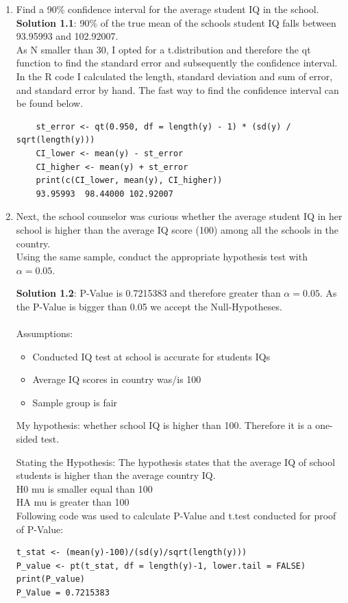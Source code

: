 \documentclass[12pt,letterpaper]{article}
\begin{document}
\begin{enumerate}
	\item Find a 90\% confidence interval for the average student IQ in the school.\\
	
\textbf{Solution 1.1}: 90\% of the true mean of the schools student IQ falls between 93.95993 and 102.92007.\\
As N smaller than 30, I opted for a t.distribution and therefore the qt function to find the standard error and subsequently the confidence interval. In the R code I calculated the length, standard deviation and sum of error, and standard error by hand. The fast way to find the confidence interval can be found below. 

\begin{verbatim}
	st_error <- qt(0.950, df = length(y) - 1) * (sd(y) / sqrt(length(y)))
	CI_lower <- mean(y) - st_error
	CI_higher <- mean(y) + st_error
	print(c(CI_lower, mean(y), CI_higher))
	93.95993  98.44000 102.92007
\end{verbatim}

	
	\item Next, the school counselor was curious  whether  the average student IQ in her school is higher than the average IQ score (100) among all the schools in the country.\\ 
	
	\noindent Using the same sample, conduct the appropriate hypothesis test with $\alpha=0.05$.
	
	\textbf{Solution 1.2}: P-Value is 0.7215383 and therefore greater than $\alpha=0.05$. As the P-Value is bigger than 0.05 we accept the Null-Hypotheses.\\
	\\
	Assumptions:
	\begin{itemize}
		\item Conducted IQ test at school is accurate for students IQs
		\item Average IQ scores in country was/is 100
		\item Sample group is fair
	\end{itemize}
	
My hypothesis: whether school IQ is higher than 100. 
Therefore it is a one-sided test.
	
Stating the Hypothesis: The hypothesis states that the average IQ of school students is higher than the average country IQ.\\
H0 mu is smaller equal than  100 \\
HA mu is greater than 100
\\
Following code was used to calculate P-Value and t.test conducted for proof of P-Value:
\begin{verbatim}
t_stat <- (mean(y)-100)/(sd(y)/sqrt(length(y))) 
P_value <- pt(t_stat, df = length(y)-1, lower.tail = FALSE)
print(P_value)
P_Value = 0.7215383


\end{verbatim}
\end{enumerate}
\end{document}
